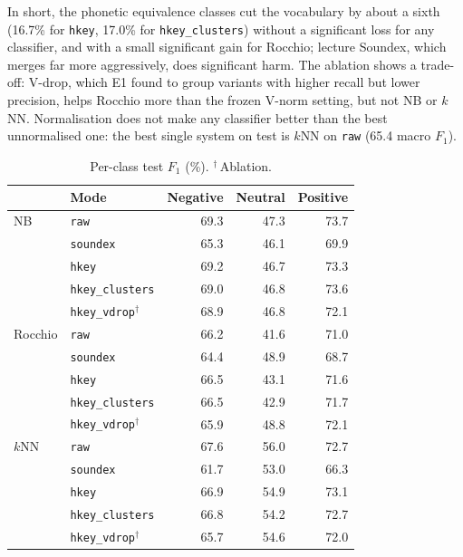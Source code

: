 In short, the phonetic equivalence classes cut the vocabulary by about a sixth (16.7\% for
\texttt{hkey}, 17.0\% for \texttt{hkey\_clusters}) without a significant loss for any classifier,
and with a small significant gain for Rocchio; lecture Soundex, which merges far more aggressively,
does significant harm. The ablation shows a trade-off: V-drop, which E1 found to group variants with
higher recall but lower precision, helps Rocchio more than the frozen V-norm setting, but not NB or
$k$NN. Normalisation does not make any classifier better than the best
unnormalised one: the best single system on test is $k$NN on \texttt{raw} (65.4 macro $F_1$).

\begin{table}[t]
\centering
\small
\caption{Per-class test $F_1$ (\%). $^\dagger$\,Ablation.}
\label{tab:e2-perclass}
\begin{tabular}{llrrr}
\toprule
 & Mode & Negative & Neutral & Positive \\
\midrule
NB      & \texttt{raw}            & 69.3 & 47.3 & 73.7 \\
        & \texttt{soundex}        & 65.3 & 46.1 & 69.9 \\
        & \texttt{hkey}           & 69.2 & 46.7 & 73.3 \\
        & \texttt{hkey\_clusters} & 69.0 & 46.8 & 73.6 \\
        & \texttt{hkey\_vdrop}$^\dagger$ & 68.9 & 46.8 & 72.1 \\
\midrule
Rocchio & \texttt{raw}            & 66.2 & 41.6 & 71.0 \\
        & \texttt{soundex}        & 64.4 & 48.9 & 68.7 \\
        & \texttt{hkey}           & 66.5 & 43.1 & 71.6 \\
        & \texttt{hkey\_clusters} & 66.5 & 42.9 & 71.7 \\
        & \texttt{hkey\_vdrop}$^\dagger$ & 65.9 & 48.8 & 72.1 \\
\midrule
$k$NN   & \texttt{raw}            & 67.6 & 56.0 & 72.7 \\
        & \texttt{soundex}        & 61.7 & 53.0 & 66.3 \\
        & \texttt{hkey}           & 66.9 & 54.9 & 73.1 \\
        & \texttt{hkey\_clusters} & 66.8 & 54.2 & 72.7 \\
        & \texttt{hkey\_vdrop}$^\dagger$ & 65.7 & 54.6 & 72.0 \\
\bottomrule
\end{tabular}
\end{table}

